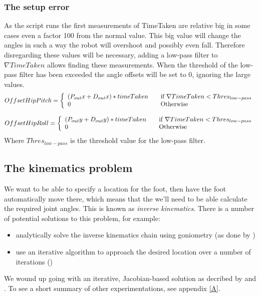 \documentclass[a4paper]{article}
\begin{document}
\subsubsection{The setup error}

As the script runs the first measurements of TimeTaken are relative big in some cases even a factor 100 from the normal value.
This big value will change the angles in such a way the robot will overshoot and possibly even fall.
Therefore disregarding these values will be necessary, adding a low-pass filter to $\nabla TimeTaken$ allows finding these measurements. When the threshold of the low-pass filter has been exceeded the angle offsets will be set to 0, ignoring the large values.
\[
  Offset Hip Pitch = \left\{ 
  \begin{array}{l l}
     (P_{out}x + D_{out}x)  * timeTaken& \quad \text{if $\nabla TimeTaken < Thres_{low-pass}$}\\ 
    0 & \quad \text{Otherwise}\\
  \end{array} \right.
\]

\[
  Offset Hip Roll = \left\{ 
  \begin{array}{l l}
     (P_{out}y + D_{out}y)  * timeTaken& \quad \text{if $\nabla TimeTaken < Thres_{low-pass}$}\\ 
    0 & \quad \text{Otherwise}\\
  \end{array} \right.
\]
Where $Thres_{low-pass}$ is the threshold value for the low-pass filter.

\subsection{The kinematics problem}
\label{sec:ik}
We want to be able to specify a location for the foot, then have the foot
automatically move there, which means that the we'll need to be able calculate
the required joint angles. This is known as \emph{inverse kinematics}. There is
a number of potential solutions to this problem, for example: 
\begin{itemize}
\item analytically solve the inverse kinematics chain using goniometry (as done by \cite{Graf2009})
\item use an iterative algorithm to approach the desired location over a number
  of iterations (\cite{Buss2009})
\end{itemize}

We wound up going with an iterative, Jacobian-based solution as decribed by
\cite{Meredith2004} and \cite{Buss2009}. To see a short summary of other
experimentations, see appendix \ref{A}.
\end{document}

